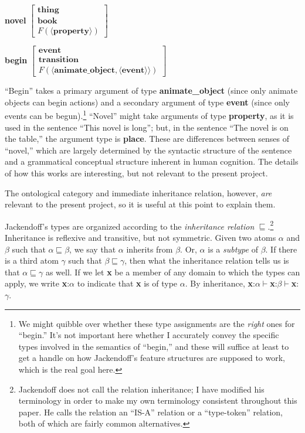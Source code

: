 \par\vspace{5mm}
{\bf novel}
$\left[
\begin{array}{l}
\textbf{thing} \\
\textbf{book} \\
F(\langle\textbf{property}\rangle)
\end{array}
\right]$
\par\vspace{5mm}
{\bf begin}
$\left[
\begin{array}{l}
\textbf{event} \\
\textbf{transition} \\
F(\langle\textbf{animate\_object},\langle\textbf{event}\rangle\rangle)
\end{array}
\right]$
\par\vspace{5mm}

``Begin'' takes a primary argument of type {\bf animate\_object} (since only animate objects can begin actions) and a secondary argument of type {\bf event} (since only events can be begun).\footnote{We might quibble over whether these type assignments are the \emph{right} ones for ``begin.'' It's not important here whether I accurately convey the specific types involved in the semantics of ``begin,'' and these will suffice at least to get a handle on how Jackendoff's feature structures are supposed to work, which is the real goal here.} ``Novel'' might take arguments of type {\bf property}, as it is used in the sentence ``This novel is long''; but, in the sentence ``The novel is on the table,'' the argument type is {\bf place}. These are differences between senses of ``novel,'' which are largely determined by the syntactic structure of the sentence and a grammatical conceptual structure inherent in human cognition. The details of how this works are interesting, but not relevant to the present project.

The ontological category and immediate inheritance relation, however, \emph{are} relevant to the present project, so it is useful at this point to explain them.

Jackendoff's types are organized according to the \emph{inheritance relation} $\sqsubseteq$.\footnote{Jackendoff does not call the relation inheritance; I have modified his terminology in order to make my own terminology consistent throughout this paper. He calls the relation an ``IS-A'' relation or a ``type-token'' relation, both of which are fairly common alternatives.} Inheritance is reflexive and transitive, but not symmetric. Given two atoms $\alpha$ and $\beta$ such that $\alpha\sqsubseteq\beta$, we say that $\alpha$ inherits from $\beta$. Or, $\alpha$ is a \emph{subtype} of $\beta$. If there is a third atom $\gamma$ such that $\beta\sqsubseteq\gamma$, then what the inheritance relation tells us is that $\alpha\sqsubseteq\gamma$ as well. If we let {\bf x} be a member of any domain to which the types can apply, we write {\bf x}:$\alpha$ to indicate that {\bf x} is of type $\alpha$. By inheritance, {\bf x}:$\alpha\vdash${\bf x}:$\beta\vdash${\bf x}:$\gamma$.

